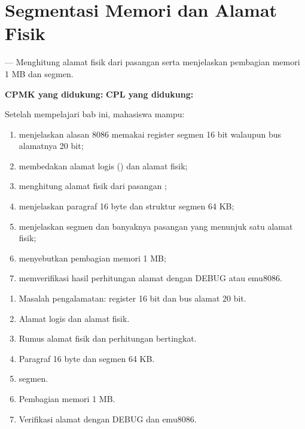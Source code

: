 \documentclass[../../main.tex]{subfiles}
\begin{document}
\chapter{Segmentasi Memori dan Alamat Fisik}
\label{chap:segmentasi}


\begin{subcpmkbox}
\vspace{1.1em}
 --- Menghitung alamat fisik dari pasangan
 serta menjelaskan pembagian memori 1 MB dan
 segmen.

\vspace{0.4em}
\textbf{CPMK yang didukung:}  \quad\textbullet\quad
\textbf{CPL yang didukung:} 
\end{subcpmkbox}

\begin{tujuanbox}
\vspace{1.1em}
Setelah mempelajari bab ini, mahasiswa mampu:
\begin{enumerate}
    \item menjelaskan alasan 8086 memakai register segmen 16 bit
          walaupun bus alamatnya 20 bit;
    \item membedakan alamat logis () dan alamat
          fisik;
    \item menghitung alamat fisik dari pasangan
          ;
    \item menjelaskan paragraf 16 byte dan struktur segmen 64 KB;
    \item menjelaskan  segmen dan banyaknya pasangan
          yang menunjuk satu alamat fisik;
    \item menyebutkan pembagian memori 1 MB;
    \item memverifikasi hasil perhitungan alamat dengan DEBUG atau
          emu8086.
\end{enumerate}
\end{tujuanbox}

\begin{materibox}
\vspace{1.1em}
\begin{enumerate}
    \item Masalah pengalamatan: register 16 bit dan bus alamat 20 bit.
    \item Alamat logis dan alamat fisik.
    \item Rumus alamat fisik dan perhitungan bertingkat.
    \item Paragraf 16 byte dan segmen 64 KB.
    \item {} segmen.
    \item Pembagian memori 1 MB.
    \item Verifikasi alamat dengan DEBUG dan emu8086.
\end{enumerate}
\end{materibox}










\end{document}
